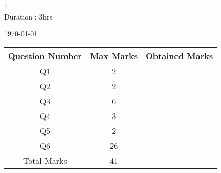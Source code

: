 \documentclass[10pt]{article}
\begin{document}
\sloppy
\vspace*{2cm}
\begin{center}
\Huge{1}\\
\vspace*{1 cm}
\Huge {Duration : 3hrs}\\
\vspace*{1 cm}
\date[\today
\\\vspace*{2 cm}
\begin{tabular}{|c|c|c|}
\hline Question Number & Max Marks & Obtained Marks \\
\hline Q1 & 2 & \\ \hline Q2 & 2 & \\ \hline Q3 & 6 & \\ \hline Q4 & 3 & \\ \hline Q5 & 2 & \\ \hline Q6 & 26 & \\ \hline Total Marks & 41 & \\
\hline \end{tabular}\end{center}
\end{document}
